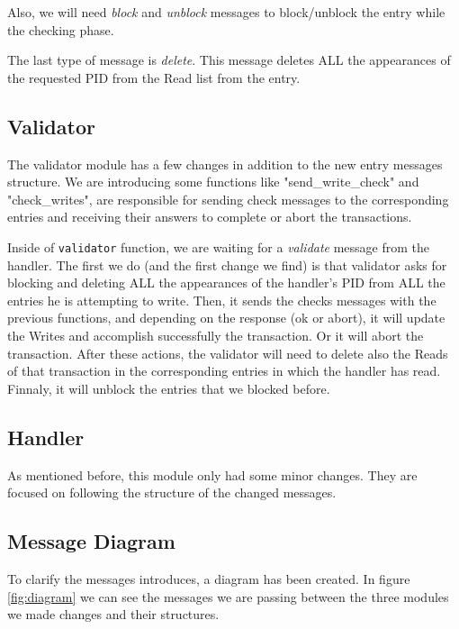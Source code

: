 \documentclass[a4paper, 10pt]{article}
\begin{document}
Also, we will need \textit{block} and \textit{unblock} messages to block/unblock the entry while the checking phase.

The last type of message is \textit{delete}. This message deletes ALL the appearances of the requested PID from the Read list from the entry.

\subsection{Validator}

The validator module has a few changes in addition to the new entry messages structure. We are introducing some functions like "send\_write\_check" and "check\_writes", are responsible for sending check messages to the corresponding entries and receiving their answers to complete or abort the transactions.

Inside of \texttt{validator} function, we are waiting for a \textit{validate} message from the handler. The first we do (and the first change we find) is that validator asks for blocking and deleting ALL the appearances of the handler's PID from ALL the entries he is attempting to write. Then, it sends the checks messages with the previous functions, and depending on the response (ok or abort), it will update the Writes and accomplish successfully the transaction. Or it will abort the transaction. After these actions, the validator will need to delete also the Reads of that transaction in the corresponding entries in which the handler has read. Finnaly, it will unblock the entries that we blocked before.


\subsection{Handler}

As mentioned before, this module only had some minor changes. They are focused on following the structure of the changed messages.

\subsection{Message Diagram}

To clarify the messages introduces, a diagram has been created. In figure \ref{fig:diagram} we can see the messages we are passing between the three modules we made changes and their structures.
\end{document}
